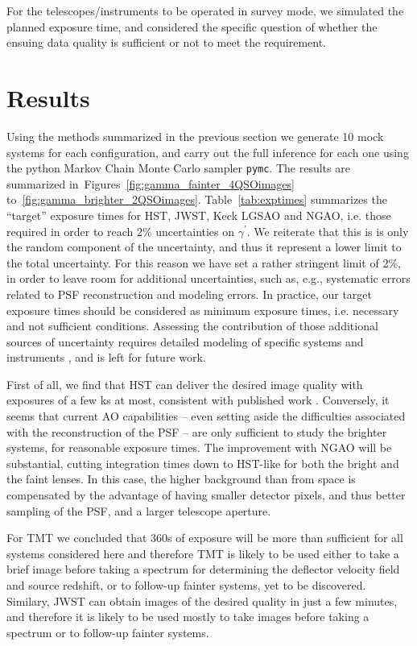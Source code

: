 \documentclass[a4paper,11pt]{article}
\begin{document}
For the telescopes/instruments to be operated in survey mode, we
simulated the planned exposure time, and considered the specific
question of whether the ensuing data quality is sufficient or not to
meet the requirement.

\section{Results}

Using the methods summarized in the previous section we generate 10
mock systems for each configuration, and carry out the full inference
for each one using the python Markov Chain Monte Carlo sampler
\texttt{pymc}.  The results are summarized
in~Figures~\ref{fig:gamma_fainter_4QSOimages}
to~\ref{fig:gamma_brighter_2QSOimages}. Table~\ref{tab:exptimes}
summarizes the ``target'' exposure times for HST, JWST, Keck LGSAO and
NGAO, i.e. those required in order to reach 2\% uncertainties on
$\gamma^{\prime}$.  We reiterate that this is is only the random
component of the uncertainty, and thus it represent a lower limit to
the total uncertainty. For this reason we have set a rather stringent
limit of 2\%, in order to leave room for additional uncertainties,
such as, e.g., systematic errors related to PSF reconstruction and
modeling errors. In practice, our target exposure times should be
considered as minimum exposure times, i.e. necessary and not
sufficient conditions. Assessing the contribution of those additional
sources of uncertainty requires detailed modeling of specific systems
and instruments \cite[e.g.,][]{2014ApJ...788L..35S}, and is left for
future work.

First of all, we find that HST can deliver the desired image quality
with exposures of a few ks at most, consistent with published work
\cite{2013ApJ...766...70S}. Conversely,
it seems that current AO capabilities -- even setting aside the
difficulties associated with the reconstruction of the PSF -- are only
sufficient to study the brighter systems, for reasonable exposure
times. The improvement with NGAO will be substantial, cutting
integration times down to HST-like for both the bright and the faint
lenses. In this case, the higher background than from space is
compensated by the advantage of having smaller detector pixels, and
thus better sampling of the PSF, and a larger telescope aperture.

For TMT we concluded that 360s of exposure will be more than
sufficient for all systems considered here and therefore TMT is likely
to be used either to take a brief image before taking a spectrum for
determining the deflector velocity field and source redshift, or to
follow-up fainter systems, yet to be discovered. Similary, JWST can
obtain images of the desired quality in just a few minutes, and
therefore it is likely to be used mostly to take images before taking
a spectrum or to follow-up fainter systems.
\end{document}

